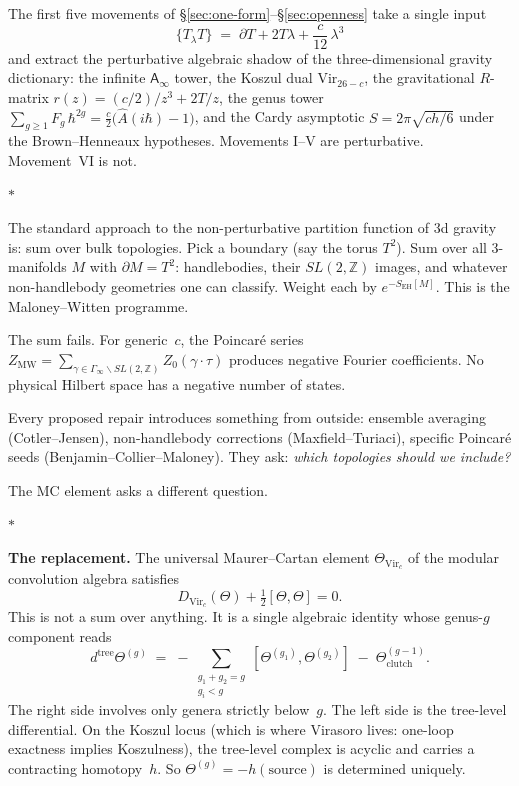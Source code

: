 \documentclass[11pt]{article}
\newcommand{\Z}{\mathbb{Z}}
\newcommand{\Ainf}{\mathsf{A}_{\infty}}
\newcommand{\sep}{\bigskip\begin{center}$*$\end{center}\medskip}
\begin{document}
The first five movements of \S\ref{sec:one-form}--\S\ref{sec:openness}
take a single input
\[
\{T{}_\lambda T\} \;=\; \partial T + 2T\lambda + \frac{c}{12}\,\lambda^3
\]
and extract the perturbative algebraic shadow of the
three-dimensional gravity dictionary: the infinite $\Ainf$ tower, the
Koszul dual $\mathrm{Vir}_{26-c}$, the gravitational $R$-matrix
$r(z) = (c/2)/z^3 + 2T/z$, the genus tower
$\sum_{g \geq 1} F_g\,\hbar^{2g}
= \tfrac{c}{2}\bigl(\hat{A}(i\hbar) - 1\bigr)$,
and the Cardy asymptotic $S = 2\pi\sqrt{ch/6}$ under the
Brown--Henneaux hypotheses.  Movements I--V are perturbative.
Movement~VI is not.

\sep

The standard approach to the non-perturbative partition function
of 3d gravity is: sum over bulk topologies.  Pick a boundary (say
the torus $T^2$).  Sum over all 3-manifolds $M$ with
$\partial M = T^2$: handlebodies, their $SL(2,\Z)$ images, and
whatever non-handlebody geometries one can classify.  Weight each
by $e^{-S_{\mathrm{EH}}[M]}$.  This is the Maloney--Witten programme.

The sum fails.  For generic~$c$, the Poincar\'e series
$Z_{\mathrm{MW}} = \sum_{\gamma \in \Gamma_\infty \backslash
SL(2,\Z)} Z_0(\gamma \cdot \tau)$ produces negative Fourier
coefficients.  No physical Hilbert space has a negative number
of states.

Every proposed repair introduces something from outside:
ensemble averaging (Cotler--Jensen), non-handlebody corrections
(Maxfield--Turiaci), specific Poincar\'e seeds
(Benjamin--Collier--Maloney).  They ask: \emph{which topologies
should we include?}

The MC element asks a different question.

\sep

\noindent\textbf{The replacement.}
The universal Maurer--Cartan element
$\Theta_{\mathrm{Vir}_c}$ of the modular convolution algebra
satisfies
\[
D_{\mathrm{Vir}_c}(\Theta) + \tfrac{1}{2}[\Theta, \Theta] = 0.
\]
This is not a sum over anything.  It is a single algebraic identity
whose genus-$g$ component reads
\[
d^{\mathrm{tree}} \Theta^{(g)}
\;=\;
-\!\!\sum_{\substack{g_1+g_2=g \\ g_i < g}}\!\!
[\Theta^{(g_1)}, \Theta^{(g_2)}]
\;-\; \Theta^{(g-1)}_{\mathrm{clutch}}.
\]
The right side involves only genera strictly below~$g$.  The
left side is the tree-level differential.  On the Koszul locus
(which is where Virasoro lives: one-loop exactness implies
Koszulness), the tree-level complex is acyclic and carries a
contracting homotopy~$h$.  So $\Theta^{(g)} = -h(\text{source})$
is determined uniquely.
\end{document}
